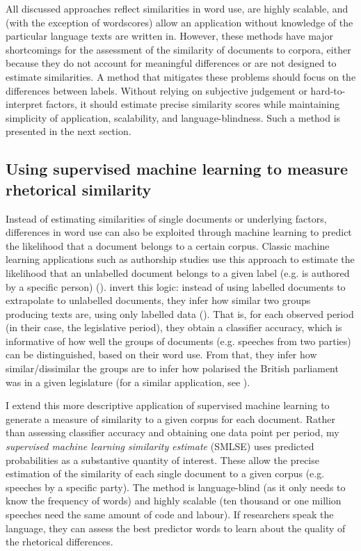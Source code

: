 \documentclass{article}
\begin{document}
All discussed approaches reflect similarities in word use, are highly scalable, and (with the exception of wordscores) allow an application without knowledge of the particular language texts are written in. However, these methods have major shortcomings for the assessment of the similarity of documents to corpora, either because they do not account for meaningful differences or are not designed to estimate similarities. A method that mitigates these problems should focus on the differences between labels. Without relying on subjective judgement or hard-to-interpret factors, it should estimate precise similarity scores while maintaining simplicity of application, scalability, and language-blindness. Such a method is presented in the next section.\par

\subsection{Using supervised machine learning to measure rhetorical similarity}
\label{sec:method}

Instead of estimating similarities of single documents or underlying factors, differences in word use can also be exploited through machine learning to predict the likelihood that a document belongs to a certain corpus. Classic machine learning applications such as authorship studies use this approach to estimate the likelihood that an unlabelled document belongs to a given label (e.g. is authored by a specific person) (\cite{Mosteller1963}). \citeauthor{Peterson2018} invert this logic: instead of using labelled documents to extrapolate to unlabelled documents, they infer how similar two groups producing texts are, using only labelled data (\citeyear{Peterson2018}). That is, for each observed period (in their case, the legislative period), they obtain a classifier accuracy, which is informative of how well the groups of documents (e.g. speeches from two parties) can be distinguished, based on their word use. From that, they infer how similar/dissimilar the groups are to infer how polarised the British parliament was in a given legislature (for a similar application, see \cite{Gentzkow2019}).\par 

I extend this more descriptive application of supervised machine learning to generate a measure of similarity to a given corpus for each document. Rather than assessing classifier accuracy and obtaining one data point per period, my \textit{supervised machine learning similarity estimate} (SMLSE) uses predicted probabilities as a substantive quantity of interest. These allow the precise estimation of the similarity of each single document to a given corpus (e.g. speeches by a specific party). The method is language-blind (as it only needs to know the frequency of words) and highly scalable (ten thousand or one million speeches need the same amount of code and labour). If researchers speak the language, they can assess the best predictor words to learn about the quality of the rhetorical differences. \par
\end{document}

